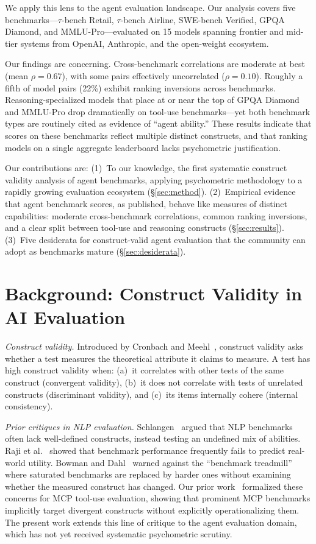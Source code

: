 \documentclass[sigconf]{acmart}
\begin{document}
We apply this lens to the agent evaluation landscape. Our analysis covers five benchmarks---$\tau$-bench Retail, $\tau$-bench Airline, SWE-bench Verified, GPQA Diamond, and MMLU-Pro---evaluated on 15 models spanning frontier and mid-tier systems from OpenAI, Anthropic, and the open-weight ecosystem.

Our findings are concerning. Cross-benchmark correlations are moderate at best (mean $\rho = 0.67$), with some pairs effectively uncorrelated ($\rho = 0.10$). Roughly a fifth of model pairs (22\%) exhibit ranking inversions across benchmarks. Reasoning-specialized models that place at or near the top of GPQA Diamond and MMLU-Pro drop dramatically on tool-use benchmarks---yet both benchmark types are routinely cited as evidence of ``agent ability.'' These results indicate that scores on these benchmarks reflect multiple distinct constructs, and that ranking models on a single aggregate leaderboard lacks psychometric justification.

Our contributions are: (1)~To our knowledge, the first systematic construct validity analysis of agent benchmarks, applying psychometric methodology to a rapidly growing evaluation ecosystem (\S\ref{sec:method}). (2)~Empirical evidence that agent benchmark scores, as published, behave like measures of distinct capabilities: moderate cross-benchmark correlations, common ranking inversions, and a clear split between tool-use and reasoning constructs (\S\ref{sec:results}). (3)~Five desiderata for construct-valid agent evaluation that the community can adopt as benchmarks mature (\S\ref{sec:desiderata}).

\section{Background: Construct Validity in AI Evaluation}
\textit{Construct validity.} Introduced by Cronbach and Meehl~\cite{cronbach1955construct}, construct validity asks whether a test measures the theoretical attribute it claims to measure. A test has high construct validity when: (a)~it correlates with other tests of the same construct (convergent validity), (b)~it does not correlate with tests of unrelated constructs (discriminant validity), and (c)~its items internally cohere (internal consistency).

\textit{Prior critiques in NLP evaluation.} Schlangen~\cite{schlangen2021targeting} argued that NLP benchmarks often lack well-defined constructs, instead testing an undefined mix of abilities. Raji et al.~\cite{raji2021ai} showed that benchmark performance frequently fails to predict real-world utility. Bowman and Dahl~\cite{bowman2021what} warned against the ``benchmark treadmill'' where saturated benchmarks are replaced by harder ones without examining whether the measured construct has changed. Our prior work~\cite{evaleval} formalized these concerns for MCP tool-use evaluation, showing that prominent MCP benchmarks implicitly target divergent constructs without explicitly operationalizing them. The present work extends this line of critique to the agent evaluation domain, which has not yet received systematic psychometric scrutiny.
\end{document}
